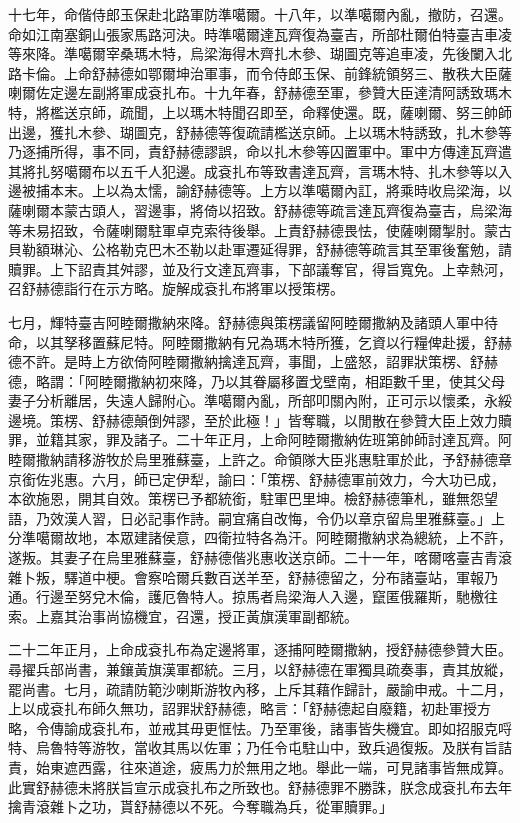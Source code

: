\begin{pinyinscope}
十七年，命偕侍郎玉保赴北路軍防準噶爾。十八年，以準噶爾內亂，撤防，召還。命如江南塞銅山張家馬路河決。時準噶爾達瓦齊復為臺吉，所部杜爾伯特臺吉車凌等來降。準噶爾宰桑瑪木特，烏梁海得木齊扎木參、瑚圖克等追車凌，先後闌入北路卡倫。上命舒赫德如鄂爾坤治軍事，而令侍郎玉保、前鋒統領努三、散秩大臣薩喇爾佐定邊左副將軍成袞扎布。十九年春，舒赫德至軍，參贊大臣達清阿誘致瑪木特，將檻送京師，疏聞，上以瑪木特聞召即至，命釋使還。既，薩喇爾、努三帥師出邊，獲扎木參、瑚圖克，舒赫德等復疏請檻送京師。上以瑪木特誘致，扎木參等乃逐捕所得，事不同，責舒赫德謬誤，命以扎木參等囚置軍中。軍中方傳達瓦齊遣其將扎努噶爾布以五千人犯邊。成袞扎布等致書達瓦齊，言瑪木特、扎木參等以入邊被捕本末。上以為太懦，諭舒赫德等。上方以準噶爾內訌，將乘時收烏梁海，以薩喇爾本蒙古頭人，習邊事，將倚以招致。舒赫德等疏言達瓦齊復為臺吉，烏梁海等未易招致，令薩喇爾駐軍卓克索待後舉。上責舒赫德畏怯，使薩喇爾掣肘。蒙古貝勒額琳沁、公格勒克巴木丕勒以赴軍遷延得罪，舒赫德等疏言其至軍後奮勉，請贖罪。上下詔責其舛謬，並及行文達瓦齊事，下部議奪官，得旨寬免。上幸熱河，召舒赫德詣行在示方略。旋解成袞扎布將軍以授策楞。

七月，輝特臺吉阿睦爾撒納來降。舒赫德與策楞議留阿睦爾撒納及諸頭人軍中待命，以其孥移置蘇尼特。阿睦爾撒納有兄為瑪木特所獲，乞資以行糧俾赴援，舒赫德不許。是時上方欲倚阿睦爾撒納擒達瓦齊，事聞，上盛怒，詔罪狀策楞、舒赫德，略謂：「阿睦爾撒納初來降，乃以其眷屬移置戈壁南，相距數千里，使其父母妻子分析離居，失遠人歸附心。準噶爾內亂，所部叩關內附，正可示以懷柔，永綏邊境。策楞、舒赫德顛倒舛謬，至於此極！」皆奪職，以閒散在參贊大臣上效力贖罪，並籍其家，罪及諸子。二十年正月，上命阿睦爾撒納佐班第帥師討達瓦齊。阿睦爾撒納請移游牧於烏里雅蘇臺，上許之。命領隊大臣兆惠駐軍於此，予舒赫德章京銜佐兆惠。六月，師已定伊犁，諭曰：「策楞、舒赫德軍前效力，今大功已成，本欲施恩，開其自效。策楞已予都統銜，駐軍巴里坤。檢舒赫德筆札，雖無怨望語，乃效漢人習，日必記事作詩。嗣宜痛自改悔，令仍以章京留烏里雅蘇臺。」上分準噶爾故地，本眾建諸侯意，四衛拉特各為汗。阿睦爾撒納求為總統，上不許，遂叛。其妻子在烏里雅蘇臺，舒赫德偕兆惠收送京師。二十一年，喀爾喀臺吉青滾雜卜叛，驛道中梗。會察哈爾兵數百送羊至，舒赫德留之，分布諸臺站，軍報乃通。行邊至努兌木倫，護厄魯特人。掠馬者烏梁海人入邊，竄匿俄羅斯，馳檄往索。上嘉其治事尚協機宜，召還，授正黃旗漢軍副都統。

二十二年正月，上命成袞扎布為定邊將軍，逐捕阿睦爾撒納，授舒赫德參贊大臣。尋擢兵部尚書，兼鑲黃旗漢軍都統。三月，以舒赫德在軍獨具疏奏事，責其放縱，罷尚書。七月，疏請防範沙喇斯游牧內移，上斥其藉作歸計，嚴諭申戒。十二月，上以成袞扎布師久無功，詔罪狀舒赫德，略言：「舒赫德起自廢籍，初赴軍授方略，令傳諭成袞扎布，並戒其毋更恇怯。乃至軍後，諸事皆失機宜。即如招服克哷特、烏魯特等游牧，當收其馬以佐軍；乃任令屯駐山中，致兵過復叛。及朕有旨詰責，始東遮西露，往來道途，疲馬力於無用之地。舉此一端，可見諸事皆無成算。此實舒赫德未將朕旨宣示成袞扎布之所致也。舒赫德罪不勝誅，朕念成袞扎布去年擒青滾雜卜之功，貰舒赫德以不死。今奪職為兵，從軍贖罪。」


\end{pinyinscope}
